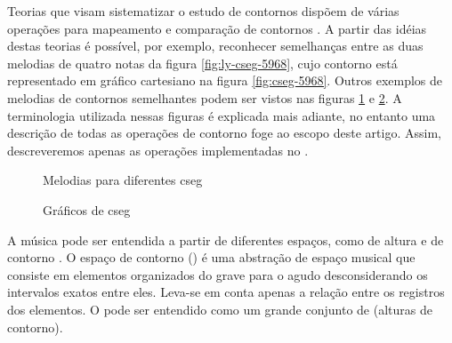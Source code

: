 Teorias que visam sistematizar o estudo de contornos dispõem de várias
operações para mapeamento e comparação de contornos
\cite{friedmann85:methodology,friedmann87:response,morris87:composition,morris93:directions,marvin.ea87:relating,clifford95:contour,polansky.ea92:possible,quinn97:fuzzy,beard03:contour}. A
partir das idéias destas teorias é possível, por exemplo, reconhecer
semelhanças entre as duas melodias de quatro notas da figura
\ref{fig:ly-cseg-5968}, cujo contorno está representado em gráfico
cartesiano na figura \ref{fig:cseg-5968}. Outros exemplos de melodias
de contornos semelhantes podem ser vistos nas figuras
\ref{fig:melodias-cseg} e \ref{fig:graficos-cseg}. A terminologia
utilizada nessas figuras é explicada mais adiante, no entanto uma
descrição de todas as operações de contorno foge ao escopo deste
artigo. Assim, descreveremos apenas as operações implementadas no
\goiaba.

\begin{figure}
  \centering
  \caption{Melodias para diferentes cseg}
  \label{fig:melodias-cseg}
\end{figure}

\begin{figure}
  \centering
  \caption{Gráficos de cseg}
  \label{fig:graficos-cseg}
\end{figure}

A música pode ser entendida a partir de diferentes espaços, como de
altura e de contorno \cite{morris87:composition}. O espaço de contorno
() é uma abstração de espaço musical que consiste em
elementos organizados do grave para o agudo desconsiderando os
intervalos exatos entre eles. Leva-se em conta apenas a relação entre
os registros dos elementos. O  pode ser entendido como
um grande conjunto de  (alturas de contorno).  

